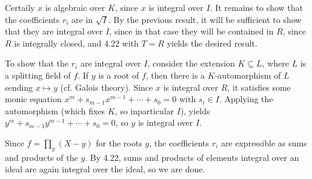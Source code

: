Certaily $x$ is algebraic over $K$, since $x$ is integral over $I$. It remains
to show that the coefficients $r_i$ are in $\sqrt{I}$. By the previous result,
it will be sufficient to show that they are integral over $I$, since in that
case they will be contained in $R$, since $R$ is integrally closed, and 4.22
with $T = R$ yields the desired result.

To show that the $r_i$ are integral over $I$, consider the extension
$K \subseteq L$, where $L$ is a splitting field of $f$. If $y$ is a root
of $f$, then there is a $K$-automorphism of $L$ sending $x\mapsto y$ (cf. Galois
theory). Since $x$ is integral over $R$, it satisfies some monic equation
$x^m + s_{m-1}x^{m-1}+\cdots + s_0 = 0$ with $s_i \in I$. Applying the automorphism
(which fixes $K$, so inparticular $I$), yields
$y^m + s_{m-1}y^{m-1} + \cdots + s_0 = 0$, so  $y$ is integral over $I$.

Since $f = \prod_y (X - y)$ for the roots $y$, the coefficients $r_i$ are
expressible as sums and products of the $y$. By 4.22, sums and products of
elements integral over an ideal are again integral over the ideal, so we are done.
